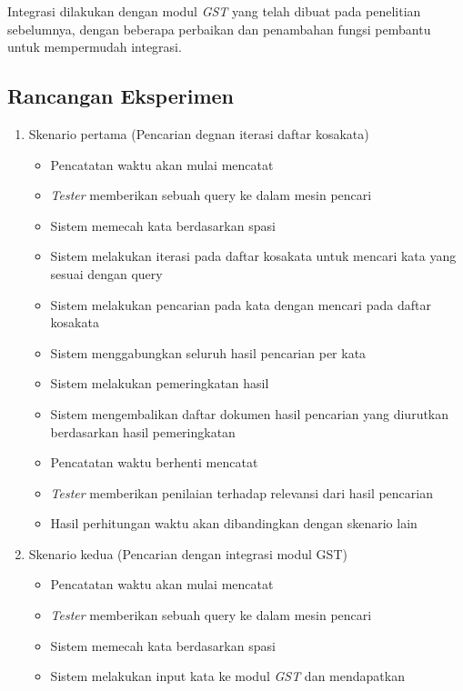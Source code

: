 Integrasi dilakukan dengan modul \textit{GST} yang telah dibuat pada penelitian 
sebelumnya, dengan beberapa perbaikan dan penambahan fungsi pembantu untuk 
mempermudah integrasi.

\subsection{Rancangan Eksperimen}

\begin{enumerate}
  \item{Skenario pertama (Pencarian degnan iterasi daftar kosakata)}
    \begin{itemize}
      \item{Pencatatan waktu akan mulai mencatat}
      \item{\textit{Tester} memberikan sebuah query ke dalam mesin pencari}
      \item{Sistem memecah kata berdasarkan spasi}
      \item{Sistem melakukan iterasi pada daftar kosakata untuk mencari kata 
        yang sesuai dengan query}
      \item{Sistem melakukan pencarian pada kata dengan mencari pada daftar 
        kosakata}
      \item{Sistem menggabungkan seluruh hasil pencarian per kata}
      \item{Sistem melakukan pemeringkatan hasil}
      \item{Sistem mengembalikan daftar dokumen hasil pencarian yang diurutkan
        berdasarkan hasil pemeringkatan}
      \item{Pencatatan waktu berhenti mencatat}
      \item{\textit{Tester} memberikan penilaian terhadap relevansi dari hasil
        pencarian}
      \item{Hasil perhitungan waktu akan dibandingkan dengan skenario lain}
    \end{itemize}
  \item{Skenario kedua (Pencarian dengan integrasi modul GST)}
    \begin{itemize}
      \item{Pencatatan waktu akan mulai mencatat}
      \item{\textit{Tester} memberikan sebuah query ke dalam mesin pencari}
      \item{Sistem memecah kata berdasarkan spasi}
      \item{Sistem melakukan input kata ke modul \textit{GST} dan mendapatkan 
}
\end{itemize}
\end{enumerate}
